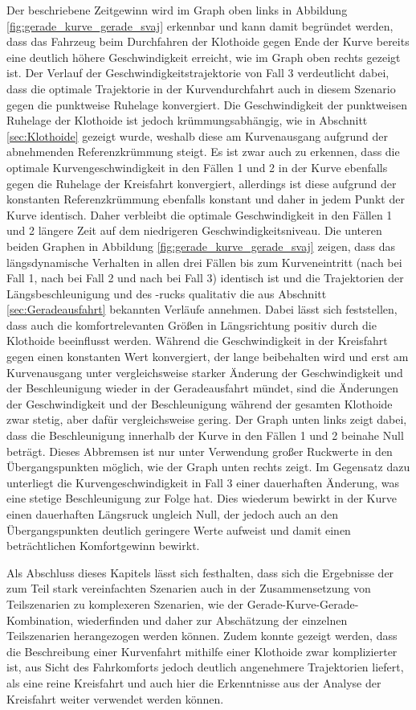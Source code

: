 Der beschriebene Zeitgewinn wird im Graph oben links in Abbildung \ref{fig:gerade_kurve_gerade_svaj} erkennbar und kann damit begründet werden, dass das Fahrzeug beim Durchfahren der Klothoide gegen Ende der Kurve bereits eine deutlich höhere Geschwindigkeit erreicht, wie im Graph oben rechts gezeigt ist. Der Verlauf der Geschwindigkeitstrajektorie von Fall 3 verdeutlicht dabei, dass die optimale Trajektorie in der Kurvendurchfahrt auch in diesem Szenario gegen die punktweise Ruhelage konvergiert. Die Geschwindigkeit der punktweisen Ruhelage der Klothoide ist jedoch krümmungsabhängig, wie in Abschnitt \ref{sec:Klothoide} gezeigt wurde, weshalb diese am Kurvenausgang aufgrund der abnehmenden Referenzkrümmung steigt. Es ist zwar auch zu erkennen, dass die optimale Kurvengeschwindigkeit in den Fällen 1 und 2 in der Kurve ebenfalls gegen die Ruhelage der Kreisfahrt konvergiert, allerdings ist diese aufgrund der konstanten Referenzkrümmung ebenfalls konstant und daher in jedem Punkt der Kurve identisch. Daher verbleibt die optimale Geschwindigkeit in den Fällen 1 und 2 längere Zeit auf dem niedrigeren Geschwindigkeitsniveau. Die unteren beiden Graphen in Abbildung \ref{fig:gerade_kurve_gerade_svaj} zeigen, dass das längsdynamische Verhalten in allen drei Fällen bis zum Kurveneintritt (nach  bei Fall 1, nach  bei Fall 2 und nach  bei Fall 3) identisch ist und die Trajektorien der Längsbeschleunigung und des -rucks qualitativ die aus Abschnitt \ref{sec:Geradeausfahrt} bekannten Verläufe annehmen. Dabei lässt sich feststellen, dass auch die komfortrelevanten Größen in Längsrichtung positiv durch die Klothoide beeinflusst werden. Während die Geschwindigkeit in der Kreisfahrt gegen einen konstanten Wert konvergiert, der lange beibehalten wird und erst am Kurvenausgang unter vergleichsweise starker Änderung der Geschwindigkeit und der Beschleunigung wieder in der Geradeausfahrt mündet, sind die Änderungen der Geschwindigkeit und der Beschleunigung während der gesamten Klothoide zwar stetig, aber dafür vergleichsweise gering. Der Graph unten links zeigt dabei, dass die Beschleunigung innerhalb der Kurve in den Fällen 1 und 2 beinahe Null beträgt. Dieses Abbremsen ist nur unter Verwendung großer Ruckwerte in den Übergangspunkten möglich, wie der Graph unten rechts zeigt. Im Gegensatz dazu unterliegt die Kurvengeschwindigkeit in Fall 3 einer dauerhaften Änderung, was eine stetige Beschleunigung zur Folge hat. Dies wiederum bewirkt in der Kurve einen dauerhaften Längsruck ungleich Null, der jedoch auch an den Übergangspunkten deutlich geringere Werte aufweist und damit einen beträchtlichen Komfortgewinn bewirkt. 

Als Abschluss dieses Kapitels lässt sich festhalten, dass sich die Ergebnisse der zum Teil stark vereinfachten Szenarien auch in der Zusammensetzung von Teilszenarien zu komplexeren Szenarien, wie der Gerade-Kurve-Gerade-Kombination, wiederfinden und daher zur Abschätzung der einzelnen Teilszenarien herangezogen werden können. Zudem konnte gezeigt werden, dass die Beschreibung einer Kurvenfahrt mithilfe einer Klothoide zwar komplizierter ist, aus Sicht des Fahrkomforts jedoch deutlich angenehmere Trajektorien liefert, als eine reine Kreisfahrt und auch hier die Erkenntnisse aus der Analyse der Kreisfahrt weiter verwendet werden können. 